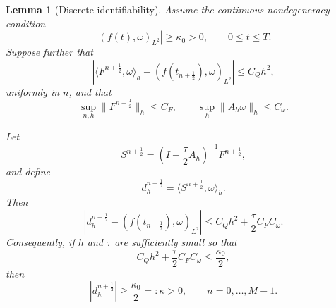 \documentclass[10pt,a4paper]{amsart}
\newtheorem{lemma}{Lemma}
\begin{document}
\begin{lemma}[Discrete identifiability]
\label{lem:discrete-identifiability}
Assume the continuous nondegeneracy condition
\begin{equation}
|(f(t),\omega)_{L^2}|
\ge
\kappa_0>0,
\qquad
0\le t\le T.
\label{eq:continuous-nondegeneracy-recall}
\end{equation}
Suppose further that
\begin{equation}
\left|
\langle F^{n+\frac12},\omega\rangle_h
-
(f(t_{n+\frac12}),\omega)_{L^2}
\right|
\le
C_Qh^2,
\label{eq:quadrature-fomega}
\end{equation}
uniformly in \(n\), and that
\begin{equation}
\sup_{n,h}\|F^{n+\frac12}\|_h\le C_F,
\qquad
\sup_h\|A_h\omega\|_h\le C_\omega.
\label{eq:identifiability-bounds}
\end{equation}

Let
\[
S^{n+\frac12}
=
\left(I+\frac{\tau}{2}A_h\right)^{-1}
F^{n+\frac12},
\]
and define
\[
d_h^{n+\frac12}
=
\langle S^{n+\frac12},\omega\rangle_h.
\]
Then
\begin{equation}
\left|
d_h^{n+\frac12}
-
(f(t_{n+\frac12}),\omega)_{L^2}
\right|
\le
C_Qh^2
+
\frac{\tau}{2}C_FC_\omega.
\label{eq:discrete-denominator-consistency}
\end{equation}
Consequently, if \(h\) and \(\tau\) are sufficiently small so that
\begin{equation}
C_Qh^2
+
\frac{\tau}{2}C_FC_\omega
\le
\frac{\kappa_0}{2},
\label{eq:mesh-identifiability-condition}
\end{equation}
then
\begin{equation}
|d_h^{n+\frac12}|
\ge
\frac{\kappa_0}{2}
=:\kappa
>0,
\qquad
n=0,\ldots,M-1.
\label{eq:discrete-identifiability}
\end{equation}
\end{lemma}
\end{document}
